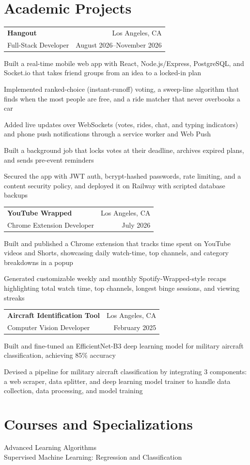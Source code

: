 \documentclass[letterpaper,10pt]{article}
\makeatletter
\newcommand{\entry}[4]{%
  \noindent\begin{tabularx}{\textwidth}{@{}X r@{}}
    \textbf{#1} & #2 \\
    #3 & #4 \\
  \end{tabularx}%
  \vspace{-2pt}
}
\makeatother
\begin{document}
\section{Academic Projects}
\entry{Hangout}{Los Angeles, CA}
      {Full-Stack Developer}{August 2026--November 2026}
\begin{tight}
  \item Built a real-time mobile web app with React, Node.js/Express, PostgreSQL, and Socket.io that takes friend groups from an idea to a locked-in plan
  \item Implemented ranked-choice (instant-runoff) voting, a sweep-line algorithm that finds when the most people are free, and a ride matcher that never overbooks a car
  \item Added live updates over WebSockets (votes, rides, chat, and typing indicators) and phone push notifications through a service worker and Web Push
  \item Built a background job that locks votes at their deadline, archives expired plans, and sends pre-event reminders
  \item Secured the app with JWT auth, bcrypt-hashed passwords, rate limiting, and a content security policy, and deployed it on Railway with scripted database backups
\end{tight}
\vspace{2pt}
\entry{YouTube Wrapped}{Los Angeles, CA}
      {Chrome Extension Developer}{July 2026}
\begin{tight}
  \item Built and published a Chrome extension that tracks time spent on YouTube videos and Shorts, showcasing daily watch-time, top channels, and category breakdowns in a popup
  \item Generated customizable weekly and monthly Spotify-Wrapped-style recaps highlighting total watch time, top channels, longest binge sessions, and viewing streaks
\end{tight}
\vspace{2pt}
\entry{Aircraft Identification Tool}{Los Angeles, CA}
      {Computer Vision Developer}{February 2025}
\begin{tight}
  \item Built and fine-tuned an EfficientNet-B3 deep learning model for military aircraft classification, achieving 85\% accuracy
  \item Devised a pipeline for military aircraft classification by integrating 3 components: a web scraper, data splitter, and deep learning model trainer to handle data collection, data processing, and model training
\end{tight}

\section{Courses and Specializations}
Advanced Learning Algorithms\\
Supervised Machine Learning: Regression and Classification
\end{document}
